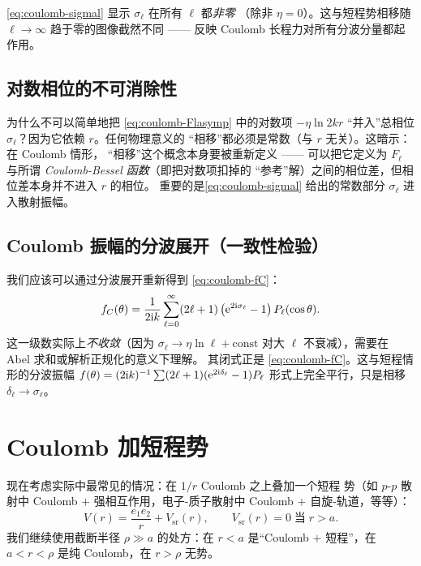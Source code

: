 \begin{remark}
\eqref{eq:coulomb-sigmal} 显示 $\sigma_\ell$ 在所有 $\ell$ 都\emph{非零}
（除非 $\eta=0$）。这与短程势相移随 $\ell\to\infty$ 趋于零的图像截然不同
—— 反映 Coulomb 长程力对所有分波分量都起作用。
\end{remark}

\subsection{对数相位的不可消除性}

为什么不可以简单地把 \eqref{eq:coulomb-Flasymp} 中的对数项 $-\eta\ln 2kr$
``并入''总相位 $\sigma_\ell$？因为它依赖 $r$。任何物理意义的
``相移''都必须是常数（与 $r$ 无关）。这暗示：在 Coulomb 情形，
``相移''这个概念本身要被重新定义 —— 可以把它定义为
$F_\ell$ 与所谓 \emph{Coulomb-Bessel 函数}（即把对数项扣掉的
``参考''解）之间的相位差，但相位差本身并不进入 $r$ 的相位。
重要的是\eqref{eq:coulomb-sigmal} 给出的常数部分 $\sigma_\ell$
进入散射振幅。

\subsection{Coulomb 振幅的分波展开（一致性检验）}

我们应该可以通过分波展开重新得到 \eqref{eq:coulomb-fC}：
\begin{equation}
  f_C(\theta)=\frac{1}{2\mathrm{i} k}\sum_{\ell=0}^\infty (2\ell+1)\,\bigl(\mathrm{e}^{2\mathrm{i}\sigma_\ell}-1\bigr)\,P_\ell(\cos\theta).
  \label{eq:coulomb-fC-partial}
\end{equation}
这一级数实际上\emph{不收敛}（因为 $\sigma_\ell\to\eta\ln\ell+\mathrm{const}$
对大 $\ell$ 不衰减），需要在 Abel 求和或解析正规化的意义下理解。
其闭式正是 \eqref{eq:coulomb-fC}。这与短程情形的分波振幅
$f(\theta)=(2\mathrm{i} k)^{-1}\sum (2\ell+1)(\mathrm{e}^{2\mathrm{i}\delta_\ell}-1)P_\ell$
形式上完全平行，只是相移 $\delta_\ell\to\sigma_\ell$。

\section{Coulomb 加短程势}\label{sec:coulomb-plus-shortrange}

现在考虑实际中最常见的情况：在 $1/r$ Coulomb 之上叠加一个短程
势（如 $p$-$p$ 散射中 Coulomb $+$ 强相互作用，电子-质子散射中
Coulomb $+$ 自旋-轨道，等等）：
\begin{equation}
  V(r)=\frac{e_1 e_2}{r}+V_{\mathrm{sr}}(r),\qquad
  V_{\mathrm{sr}}(r)=0\;\text{当}\;r>a.
  \label{eq:coulomb-V-sr}
\end{equation}
我们继续使用截断半径 $\rho\gg a$ 的处方：在 $r<a$ 是``Coulomb $+$
短程''，在 $a<r<\rho$ 是纯 Coulomb，在 $r>\rho$ 无势。

